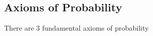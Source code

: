 \documentclass[../notes.tex]{subfiles}
\begin{document}

\subsection{Axioms of Probability}

There are $3$ fundamental axioms of probability
\end{document}
